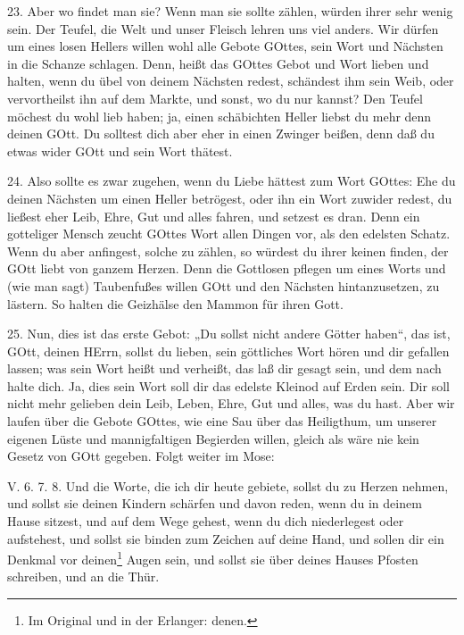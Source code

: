 23. Aber wo findet man sie? Wenn man sie sollte zählen, würden ihrer sehr wenig sein. Der Teufel, die Welt und unser Fleisch lehren uns viel anders. Wir dürfen um eines losen Hellers willen wohl alle Gebote GOttes, sein Wort und Nächsten in die Schanze schlagen. Denn, heißt das GOttes Gebot und Wort lieben und halten, wenn du übel von deinem Nächsten redest, schändest ihm sein Weib, oder vervortheilst ihn auf dem Markte, und sonst, wo du nur kannst? Den Teufel möchest du wohl lieb haben; ja, einen schäbichten Heller liebst du mehr denn deinen GOtt. Du solltest dich aber eher in einen Zwinger beißen, denn daß du etwas wider GOtt und sein Wort thätest.

24. Also sollte es zwar zugehen, wenn du Liebe hättest zum Wort GOttes: Ehe du deinen Nächsten um einen Heller betrögest, oder ihn ein Wort zuwider redest, du ließest eher Leib, Ehre, Gut und alles fahren, und setzest es dran. Denn ein gotteliger Mensch zeucht GOttes Wort allen Dingen vor, als den edelsten Schatz. Wenn du aber anfingest, solche zu zählen, so würdest du ihrer keinen finden, der GOtt liebt von ganzem Herzen. Denn die Gottlosen pflegen um eines Worts und (wie man sagt) Taubenfußes willen GOtt und den Nächsten hintanzusetzen, zu lästern. So halten die Geizhälse den Mammon für ihren Gott.

25. Nun, dies ist das erste Gebot: „Du sollst nicht andere Götter haben“, das ist, GOtt, deinen HErrn, sollst du lieben, sein göttliches Wort hören und dir gefallen lassen; was sein Wort heißt und verheißt, das laß dir gesagt sein, und dem nach halte dich. Ja, dies sein Wort soll dir das edelste Kleinod auf Erden sein. Dir soll nicht mehr gelieben dein Leib, Leben, Ehre, Gut und alles, was du hast. Aber wir laufen über die Gebote GOttes, wie eine Sau über das Heiligthum, um unserer eigenen Lüste und mannigfaltigen Begierden willen, gleich als wäre nie kein Gesetz von GOtt gegeben. Folgt weiter im Mose:

\begin{schriftzitat}
V. 6. 7. 8. Und die Worte, die ich dir heute gebiete, sollst du zu Herzen nehmen, und sollst sie deinen Kindern schärfen und davon reden, wenn du in deinem Hause sitzest, und auf dem Wege gehest, wenn du dich niederlegest oder aufstehest, und sollst sie binden zum Zeichen auf deine Hand, und sollen dir ein Denkmal vor deinen\footnote{Im Original und in der Erlanger: denen.} Augen sein, und sollst sie über deines Hauses Pfosten schreiben, und an die Thür.
\end{schriftzitat}

